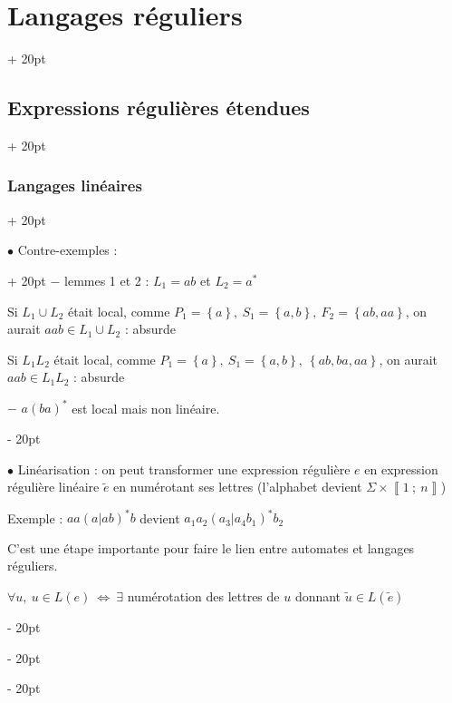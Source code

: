 \documentclass[a4paper, 12pt, twoside]{article}
\newcommand{\nset}[2]{\left\llbracket #1\ ;\ #2 \right\rrbracket}
\newcommand{\set}[1]{\left\{ #1 \right\}}
\newcommand{\ssi}{\ \Leftrightarrow \ }
\newcommand{\ind}[1][20pt]{\advance\leftskip + #1}
\newcommand{\deind}[1][20pt]{\advance\leftskip - #1}
\newenvironment{indt}[2][20pt]{#2 \par \ind[#1]}{\par \deind} %
\begin{document}
\begin{indt}{\section{Langages réguliers}}
\begin{indt}{\subsection{Expressions régulières étendues}}
\begin{indt}{\subsubsection{Langages linéaires}}
                \vspace{12pt}
                
                \begin{indt}{$\bullet$ Contre-exemples :}
                    $-$ lemmes 1 et 2 : $L_1 = ab$ et $L_2 = a^*$

                    Si $L_1 \cup L_2$ était local, comme $P_1 = \set a,\ S_1 = \set{a, b},\ F_2 = \set{ab, aa}$, on aurait $aab \in L_1 \cup L_2$ : absurde

                    Si $L_1 L_2$ était local, comme $P_1 = \set a,\ S_1 = \set{a, b},\ \set{ab, ba, aa}$, on aurait $aab \in L_1 L_2$ : absurde

                    \vspace{6pt}
                    
                    $-$ $a(ba)^*$ est local mais non linéaire.
                \end{indt}

                \vspace{12pt}
                
                $\bullet$ Linéarisation : on peut transformer une expression régulière $e$ en expression régulière linéaire $\tilde e$ en numérotant ses lettres (l'alphabet devient $\Sigma \times \nset 1 n$)

                \vspace{12pt}
                
                Exemple : $aa(a | ab)^*b$ devient $a_1a_2(a_3 | a_4b_1)^*b_2$

                C'est une étape importante pour faire le lien entre automates et langages réguliers.

                 $\forall u,\ u \in L(e) \ssi \exists$ numérotation des lettres de $u$ donnant $\tilde u \in L(\tilde e)$
            \end{indt}
        \end{indt}
    \end{indt}

    \vspace{12pt}
    
\end{document}
